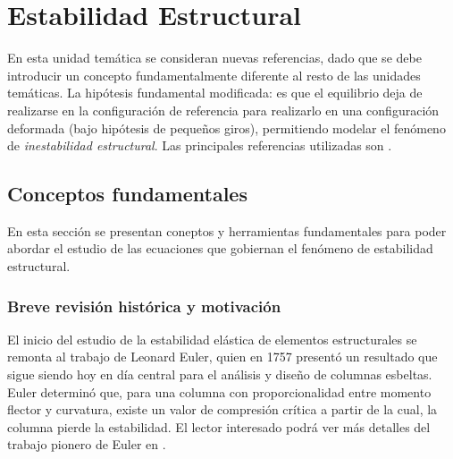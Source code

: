 %
%
%

\chapter{Estabilidad Estructural}

En esta unidad temática se consideran nuevas referencias, dado que se debe introducir un concepto fundamentalmente diferente al resto de las unidades temáticas. %
%
La hipótesis fundamental modificada: es que el equilibrio deja de realizarse en la configuración de referencia para realizarlo en una configuración deformada (bajo hipótesis de pequeños giros), permitiendo modelar el fenómeno de \textit{inestabilidad estructural}. %
%
Las principales referencias utilizadas son \citep{yoo2011,Bazzano2017}. 

\section{Conceptos fundamentales} 

En esta sección se presentan coneptos y herramientas fundamentales para poder abordar el estudio de las ecuaciones que gobiernan el fenómeno de estabilidad estructural.

\subsection{Breve revisión histórica y motivación}

El inicio del estudio de la estabilidad elástica de elementos estructurales se remonta al trabajo de Leonard Euler, quien en 1757 presentó un resultado que sigue siendo hoy en día central para el análisis y diseño de columnas esbeltas. %
%
Euler determinó que, para una columna con proporcionalidad entre momento flector y curvatura, existe un valor de compresión crítica a partir de la cual, la columna pierde la estabilidad. %
%
El lector interesado podrá ver más detalles del trabajo pionero de Euler en \citep{Timoshenko1953}.

